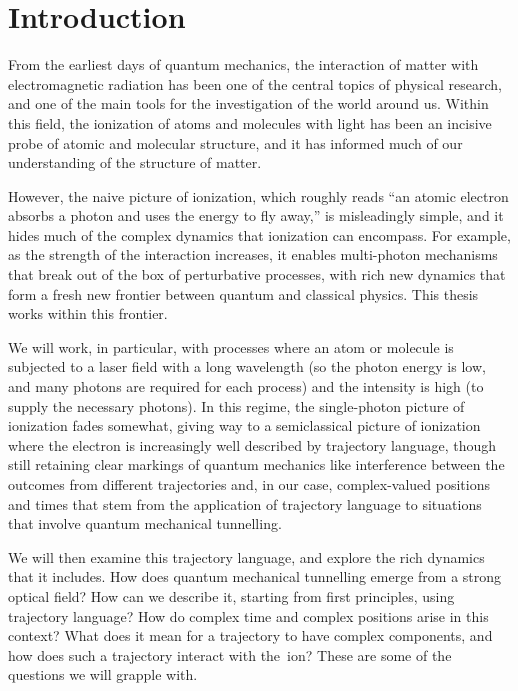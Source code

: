 







\chapter{Introduction}


From the earliest days of quantum mechanics, the interaction of matter with electromagnetic radiation has been one of the central topics of physical research, and one of the main tools for the investigation of the world around us. Within this field, the ionization of atoms and molecules with light has been an incisive probe of atomic and molecular structure, and it has informed much of our understanding of the structure of matter. 

However, the naive picture of ionization, which roughly reads ``an atomic electron absorbs a photon and uses the energy to fly away,'' is misleadingly simple, and it hides much of the complex dynamics that ionization can encompass. For example, as the strength of the interaction increases, it enables multi-photon mechanisms that break out of the box of perturbative processes, with rich new dynamics that form a fresh new frontier between quantum and classical physics. This thesis works within this frontier.

We will work, in particular, with processes where an atom or molecule is subjected to a laser field with a long wavelength (so the photon energy is low, and many photons are required for each process) and the intensity is high (to supply the necessary photons). In this regime, the single-photon picture of ionization fades somewhat, giving way to a semiclassical picture of ionization where the electron is increasingly well described by trajectory language, though still retaining clear markings of quantum mechanics like interference between the outcomes from different trajectories and, in our case, complex-valued positions and times that stem from the application of trajectory language to situations that involve quantum mechanical tunnelling.

We will then examine this trajectory language, and explore the rich dynamics that it includes. How does quantum mechanical tunnelling emerge from a strong optical field? How can we describe it, starting from first principles, using trajectory language? How do complex time and complex positions arise in this context? What does it mean for a trajectory to have complex components, and how does such a trajectory interact with the~ion? These are some of the questions we will grapple with.

